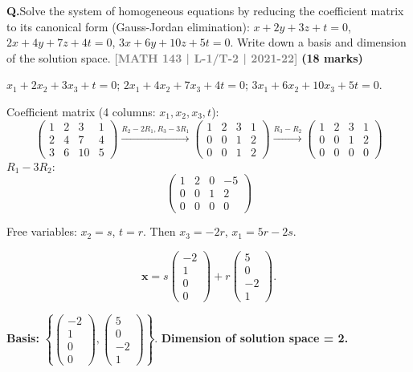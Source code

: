 \documentclass[12pt,a3paper]{article}
\newcommand{\yr}[1]{\hfill\textcolor{gray}{\small\textbf{[#1]}}}
\newcommand{\mk}[1]{\textcolor{orange!70!black}{\small\textbf{(#1 marks)}}}
\newcounter{qnum}
\newcommand{\Q}[1]{%
  \needspace{4\baselineskip}
  \refstepcounter{qnum}
  \vspace{6pt}
  \noindent\textbf{Q\theqnum.}\enspace #1\par
}
\begin{document}
\Q{Solve the system of homogeneous equations by reducing the coefficient matrix to its canonical form (Gauss-Jordan elimination):
$x + 2y + 3z + t = 0$, $2x + 4y + 7z + 4t = 0$, $3x + 6y + 10z + 5t = 0$.
Write down a basis and dimension of the solution space.
\yr{MATH 143 | L-1/T-2 | 2021-22} \mk{18}}

\begin{tcolorbox}[enhanced,breakable,
  colback=cB!4,colframe=cB,boxrule=0.8pt,arc=5pt,
  title={\textbf{Answer --- Homogeneous System: Basis \& Dimension of Solution Space}},
  fonttitle=\bfseries\color{white},colbacktitle=cB]

$x_1+2x_2+3x_3+t=0$;\; $2x_1+4x_2+7x_3+4t=0$;\; $3x_1+6x_2+10x_3+5t=0$.

Coefficient matrix (4 columns: $x_1,x_2,x_3,t$):
\[
\begin{pmatrix}1&2&3&1\\2&4&7&4\\3&6&10&5\end{pmatrix}
\xrightarrow{R_2-2R_1,R_3-3R_1}
\begin{pmatrix}1&2&3&1\\0&0&1&2\\0&0&1&2\end{pmatrix}
\xrightarrow{R_3-R_2}
\begin{pmatrix}1&2&3&1\\0&0&1&2\\0&0&0&0\end{pmatrix}
\]
$R_1-3R_2$:
\[
\begin{pmatrix}1&2&0&-5\\0&0&1&2\\0&0&0&0\end{pmatrix}
\]

Free variables: $x_2=s$, $t=r$. Then $x_3=-2r$, $x_1=5r-2s$.

\[
\mathbf{x}=s\begin{pmatrix}-2\\1\\0\\0\end{pmatrix}+r\begin{pmatrix}5\\0\\-2\\1\end{pmatrix}.
\]

\textbf{Basis:} $\left\{\begin{pmatrix}-2\\1\\0\\0\end{pmatrix},\begin{pmatrix}5\\0\\-2\\1\end{pmatrix}\right\}$.
\quad\textbf{Dimension of solution space = 2.}

\end{tcolorbox}
\end{document}
